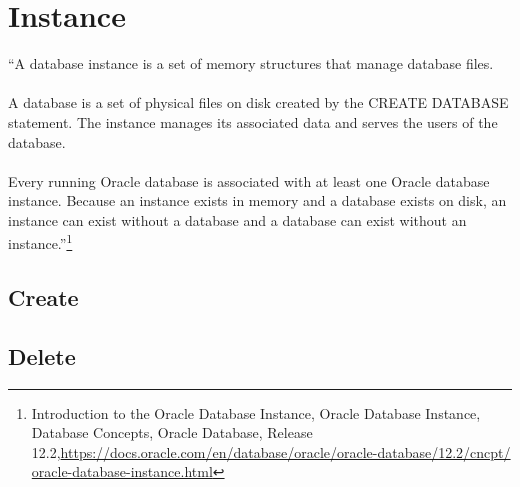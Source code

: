 
\newpage
\setcounter{secnumdepth}{0}

\section{Instance}

``A database instance is a set of memory structures that manage 
database files.\\
\\
A database is a set of physical files on disk created by the 
CREATE DATABASE statement.  The instance manages its associated 
data and serves the users of the database.\\
\\
Every running Oracle database is associated with at least one 
Oracle database instance.  Because an instance exists in memory
and a database exists on disk, an instance can exist without a 
database and a database can exist without an instance.''\footnote{Introduction to the Oracle Database Instance, Oracle Database Instance, Database Concepts, Oracle Database,
    Release 12.2,\href{https://docs.oracle.com/en/database/oracle/oracle-database/12.2/cncpt/oracle-database-instance.html}{https://docs.oracle.com/en/database/oracle/oracle-database/12.2/cncpt/}\newline
  \href{https://docs.oracle.com/en/database/oracle/oracle-database/12.2/cncpt/oracle-database-instance.html}{oracle-database-instance.html}}


\subsection{Create}


\subsection{Delete}
